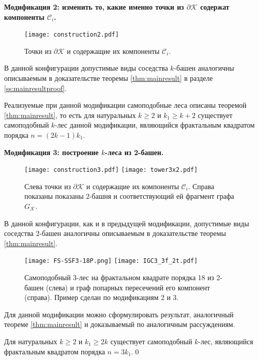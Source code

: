 \textbf{Модификация 2: изменить то, какие именно точки из $\partial{\mathcal{K}}$ содержат компоненты $\mathcal{C}_i$.}

\begin{figure}[H]
\centering
\texttt{[image: construction2.pdf]}
\caption{Точки из $\partial{\mathcal{K}}$ и содержащие их компоненты $\mathcal{C}_i$.}
\end{figure}

В данной конфигурации допустимые виды соседства $k$-башен аналогичны описываемым в доказательстве теоремы \ref{thm:mainresult} в разделе \ref{ss:mainresultproof}.

Реализуемые при данной модификации самоподобные леса описаны теоремой \ref{thm:mainresult}, то есть для натуральных $k\geq2$  и  $ k_1\ge k+2$ существует самоподобный $k$-лес данной модификации, являющийся фрактальным квадратом порядка $n=(2k-1)k_1$.



\textbf{Модификация 3: построение $k$-леса из 2-башен.}

\begin{figure}[H]
\texttt{[image: construction3.pdf]}
\hfill
\texttt{[image: tower3x2.pdf]}
\caption{Слева точки из $\partial{\mathcal{K}}$ и содержащие их компоненты $\mathcal{C}_i$. Справа показаны показаны $2$-башня и соответствующий ей фрагмент графа $G_{\mathcal{K}}$.}
\end{figure}

В данной конфигурации, как и в предыдущей модификации, допустимые виды соседства $2$-башен аналогичны описываемым в доказательстве теоремы \ref{thm:mainresult}.

\begin{figure}[H]
\hfill
\texttt{[image: FS-SSF3-18P.png]}
\hfill
\texttt{[image: IGC3\_3f\_2t.pdf]}
\caption{Самоподобный 3-лес на фрактальном квадрате порядка 18 из 2-башен (слева) и граф попарных пересечений его компонент (справа). Пример сделан по модификациям 2 и 3.}
\end{figure}

Для данной модификации можно сформулировать результат, аналогичный теореме \ref{thm:mainresult} и доказываемый по аналогичным рассуждениям.

\begin{corollary}
Для натуральных $k\geq2$ и $k_1\ge 2k$ существует самоподобный $k$-лес, являющийся фрактальным квадратом порядка $n=3k_1$.\qed
\end{corollary} 